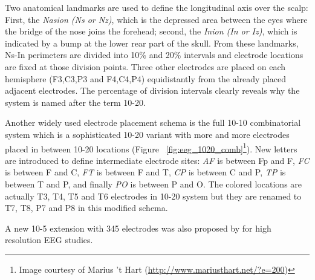 \documentclass[12pt]{article}
\numberwithin{equation}{section}
\numberwithin{figure}{section}
\numberwithin{table}{section}
\begin{document}
\par{
    Two anatomical landmarks are used to define the longitudinal axis over the scalp: First, the \emph{Nasion (Ns or Nz)}, which is the
    depressed area between the eyes where the bridge of the nose joins the forehead; second, the \emph{Inion (In or Iz)}, which is
    indicated by a bump at the lower rear part of the skull. From these landmarks, Ns-In perimeters are divided into 10\% and 20\% intervals
    and electrode locations are fixed at those division points. Three other electrodes are placed on each hemisphere
    (F3,C3,P3 and F4,C4,P4) equidistantly from the already placed adjacent electrodes. The percentage of division intervals
    clearly reveals why the system is named after the term 10-20.
}

\par{
    Another widely used electrode placement schema is the full 10-10 combinatorial
    system \citeyearpar{guideline_1994} which is a sophisticated 10-20
    variant with more and more electrodes placed in between 10-20 locations
    (Figure ~\ref{fig:eeg_1020_comb}\footnote{Image courtesy of Marius 't Hart (\url{http://www.mariusthart.net/?e=200})}).
    New letters are introduced to define intermediate electrode sites: \emph{AF} is between Fp and F, \emph{FC} is between F and C,
    \emph{FT} is between F and T, \emph{CP} is between C and P, \emph{TP} is between T and P, and finally \emph{PO} is between P and O.
    The colored locations are actually T3, T4, T5 and T6 electrodes in 10-20 system but
    they are renamed to T7, T8, P7 and P8 in this modified schema.
}

\par{
    A new 10-5 extension with 345 electrodes was also proposed by \citet{oostenveld_five_2001} for high resolution EEG studies.
}
\end{document}
